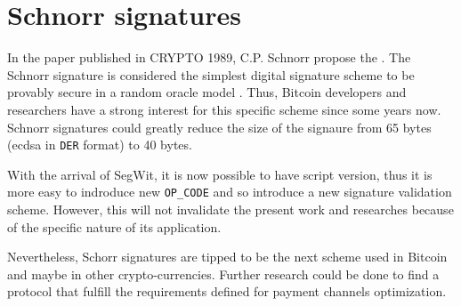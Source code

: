 \section{Schnorr signatures}

In the paper  published
in CRYPTO 1989, C.P. Schnorr propose the 
\cite{10.1007/0-387-34805-0_22}.
The Schnorr signature is considered the simplest digital signature scheme to
be provably secure in a random oracle model \cite{Bellare:1993:ROP:168588.168596,
10.1007/978-3-642-29011-4_33}. Thus, Bitcoin developers and
researchers have a strong interest for this specific scheme since some years now.
Schnorr signatures could greatly reduce the size of the signaure from 65 bytes (\gls{ecdsa}
in \texttt{DER} format) to 40 bytes.

With the arrival of SegWit, it is now possible to have script version, thus it is
more easy to indroduce new \texttt{OP\_CODE} and so introduce a new signature validation
scheme. However, this will not invalidate the present work and researches because
of the specific nature of its application.

Nevertheless, Schorr signatures are tipped to be the next scheme used in Bitcoin
and maybe in other crypto-currencies. Further research could be done to find a
protocol that fulfill the requirements defined for payment channels optimization.

